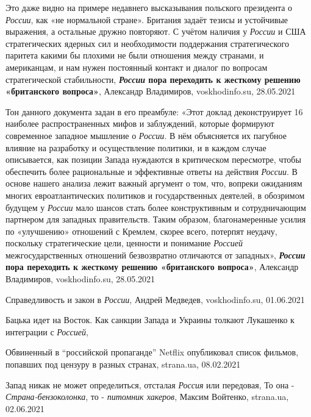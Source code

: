 Это даже видно на примере недавнего высказывания польского президента о \emph{России},
как «не нормальной стране». Британия задаёт тезисы и устойчивые выражения, а
остальные дружно повторяют. С учётом наличия у \emph{России} и США стратегических
ядерных сил и необходимости поддержания стратегического паритета какими бы
плохими не были отношения между странами, и американцам, и нам нужен постоянный
контакт и диалог по вопросам стратегической стабильности,
\textbf{\emph{России} пора переходить к жесткому решению «британского вопроса»}, 
Александр Владимиров, voskhodinfo.su, 28.05.2021

Тон данного документа задан в его преамбуле: «Этот доклад деконструирует 16
наиболее распространенных мифов и заблуждений, которые формируют современное
западное мышление о \emph{России}. В нём объясняется их пагубное влияние на
разработку и осуществление политики, и в каждом случае описывается, как позиции
Запада нуждаются в критическом пересмотре, чтобы обеспечить более рациональные
и эффективные ответы на действия \emph{России}. В основе нашего анализа лежит
важный аргумент о том, что, вопреки ожиданиям многих евроатлантических
политиков и государственных деятелей, в обозримом будущем у \emph{России} мало
шансов стать более конструктивным и сотрудничающим партнером для западных
правительств. Таким образом, благонамеренные усилия по «улучшению» отношений с
Кремлем, скорее всего, потерпят неудачу, поскольку стратегические цели,
ценности и понимание \emph{Россией} межгосударственных отношений безвозвратно
отличаются от западных»,
\textbf{\emph{России} пора переходить к жесткому решению «британского вопроса»}, 
Александр Владимиров, voskhodinfo.su, 28.05.2021

Справедливость и закон в \emph{России}, Андрей Медведев, voskhodinfo.su, 01.06.2021

Бацька идет на Восток. Как санкции Запада и Украины толкают Лукашенко к интеграции с \emph{Россией},

Обвиненный в \enquote{российской пропаганде} Netflix опубликовал список фильмов, попавших под цензуру в разных странах,
strana.ua, 08.02.2021

Запад никак не может определиться, отсталая \emph{Россия} или передовая, То она - \emph{Страна-бензоколонка}, то - \emph{питомник хакеров},
Максим Войтенко, strana.ua, 02.06.2021


